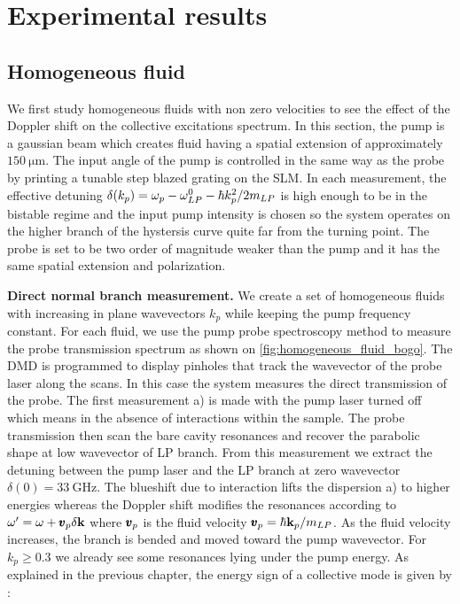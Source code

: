 \section{Experimental results}

\subsection{Homogeneous fluid}

We first study homogeneous fluids with non zero velocities to see the effect of the Doppler shift on the collective excitations spectrum. In this section,
the pump is a gaussian beam which creates fluid having a spatial extension of approximately $150 \ \mathrm{\mu m}$. The input angle of the pump
is controlled in the same way as the probe by printing a tunable step blazed grating on the SLM. In each measurement, the effective detuning 
$\delta(k_p)=\omega_p -\omega_{LP}^0- \hbar k_p^2/2m_{LP}$ is high enough to be in the bistable regime and the input pump intensity is chosen so the system operates on the higher branch of the hystersis curve quite far from the turning point. 
The probe is set to be two order of magnitude weaker than the pump and it has the same spatial extension and polarization.

\bigskip

\textbf{Direct normal branch measurement.} We create a set of homogeneous fluids with increasing in plane wavevectors $k_p$ while keeping the pump frequency constant. 
For each fluid, we use the pump probe spectroscopy method to measure the probe transmission spectrum as shown on \autoref{fig:homogeneous_fluid_bogo}. 
The DMD is programmed to display pinholes that track the wavevector of the probe laser along the scans. In this case the system measures the direct transmission of the probe. The first measurement a) is made with the pump laser turned off which means in the absence of interactions within the sample.
The probe transmission then scan the bare cavity resonances and recover the parabolic shape at low wavevector of LP branch. From this measurement we extract the detuning between the pump laser and the LP branch at zero wavevector
 $\delta(0) = \SI{33}{\giga\hertz}$. 
 The blueshift due to interaction lifts the dispersion a) to higher energies whereas the Doppler shift modifies the resonances according to 
 $\omega' = \omega + \pmb{v}_p\delta \mathbf{k}$ where $\pmb{v}_p$ is the fluid velocity $\pmb{v}_p = \hbar \mathbf{k}_p/m_{LP}$.  As the fluid velocity increases, the branch is bended and moved toward the pump wavevector. 
 For $k_p\geq 0.3$ we already see some resonances lying under the pump energy. As explained in the previous chapter, the energy sign of a collective mode is given by :
 
